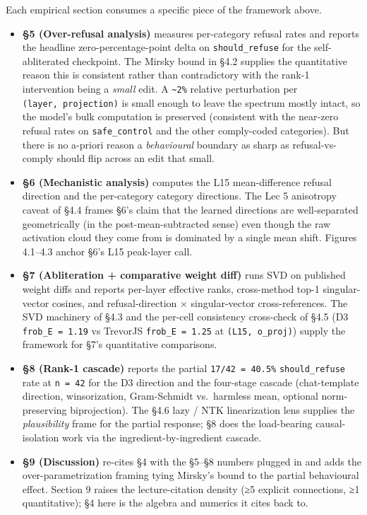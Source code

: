 \documentclass[
  11pt,
]{article}
\begin{document}
Each empirical section consumes a specific piece of the framework above.

\begin{itemize}
\item
  \textbf{§5 (Over-refusal analysis)} measures per-category refusal
  rates and reports the headline zero-percentage-point delta on
  \texttt{should\_refuse} for the self-abliterated checkpoint. The
  Mirsky bound in §4.2 supplies the quantitative reason this is
  consistent rather than contradictory with the rank-1 intervention
  being a \emph{small} edit. A \texttt{\textasciitilde{}2\%} relative
  perturbation per \texttt{(layer,\ projection)} is small enough to
  leave the spectrum mostly intact, so the model's bulk computation is
  preserved (consistent with the near-zero refusal rates on
  \texttt{safe\_control} and the other comply-coded categories). But
  there is no a-priori reason a \emph{behavioural} boundary as sharp as
  refusal-vs-comply should flip across an edit that small.
\item
  \textbf{§6 (Mechanistic analysis)} computes the L15 mean-difference
  refusal direction and the per-category category directions. The Lec 5
  anisotropy caveat of §4.4 frames §6's claim that the learned
  directions are well-separated geometrically (in the
  post-mean-subtracted sense) even though the raw activation cloud they
  come from is dominated by a single mean shift. Figures 4.1--4.3 anchor
  §6's L15 peak-layer call.
\item
  \textbf{§7 (Abliteration + comparative weight diff)} runs SVD on
  published weight diffs and reports per-layer effective ranks,
  cross-method top-1 singular-vector cosines, and refusal-direction ×
  singular-vector cross-references. The SVD machinery of §4.3 and the
  per-cell consistency cross-check of §4.5 (D3 \texttt{frob\_E\ =\ 1.19}
  vs TrevorJS \texttt{frob\_E\ =\ 1.25} at \texttt{(L15,\ o\_proj)})
  supply the framework for §7's quantitative comparisons.
\item
  \textbf{§8 (Rank-1 cascade)} reports the partial
  \texttt{17/42\ =\ 40.5\%} \texttt{should\_refuse} rate at
  \texttt{n\ =\ 42} for the D3 direction and the four-stage cascade
  (chat-template direction, winsorization, Gram-Schmidt vs.~harmless
  mean, optional norm-preserving biprojection). The §4.6 lazy / NTK
  linearization lens supplies the \emph{plausibility} frame for the
  partial response; §8 does the load-bearing causal-isolation work via
  the ingredient-by-ingredient cascade.
\item
  \textbf{§9 (Discussion)} re-cites §4 with the §5--§8 numbers plugged
  in and adds the over-parametrization framing tying Mirsky's bound to
  the partial behavioural effect. Section 9 raises the lecture-citation
  density (≥5 explicit connections, ≥1 quantitative); §4 here is the
  algebra and numerics it cites back to.
\end{itemize}
\end{document}
